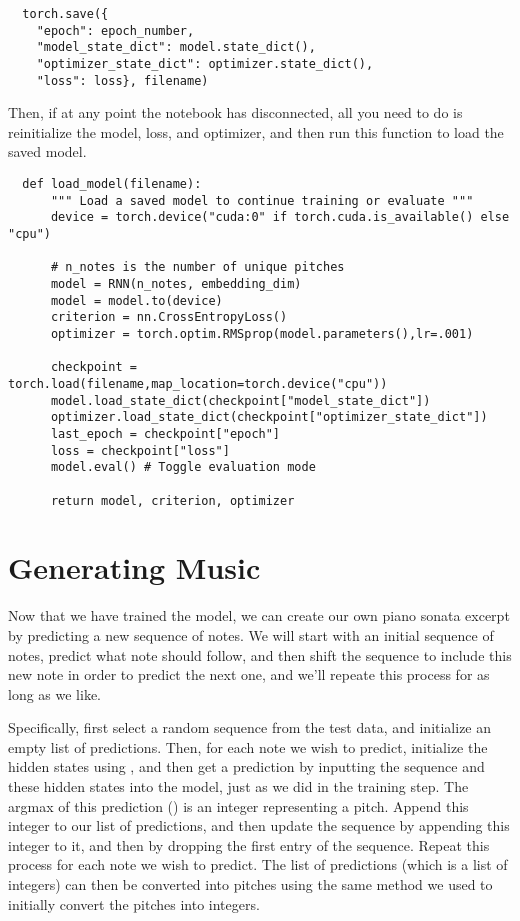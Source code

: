 \begin{problem}
\begin{warn}
\begin{lstlisting}
  torch.save({
    "epoch": epoch_number,
    "model_state_dict": model.state_dict(),
    "optimizer_state_dict": optimizer.state_dict(),
    "loss": loss}, filename)
\end{lstlisting}

Then, if at any point the notebook has disconnected, all you need to do is reinitialize the model, loss, and optimizer, and then run this function to load the saved model.
\begin{lstlisting}
  def load_model(filename):
      """ Load a saved model to continue training or evaluate """
      device = torch.device("cuda:0" if torch.cuda.is_available() else "cpu")

      # n_notes is the number of unique pitches
      model = RNN(n_notes, embedding_dim)
      model = model.to(device)
      criterion = nn.CrossEntropyLoss()
      optimizer = torch.optim.RMSprop(model.parameters(),lr=.001)

      checkpoint = torch.load(filename,map_location=torch.device("cpu"))
      model.load_state_dict(checkpoint["model_state_dict"])
      optimizer.load_state_dict(checkpoint["optimizer_state_dict"])
      last_epoch = checkpoint["epoch"]
      loss = checkpoint["loss"]
      model.eval() # Toggle evaluation mode

      return model, criterion, optimizer
  \end{lstlisting}
\end{warn}
\end{problem}

\section*{Generating Music}
Now that we have trained the model, we can create our own piano sonata excerpt by predicting a new sequence of notes.
We will start with an initial sequence of notes, predict what note should follow, and then shift the sequence to include this new note in order to predict the next one, and we'll repeate this process for as long as we like.

Specifically, first select a random sequence from the test data, and initialize an empty list of predictions.
Then, for each note we wish to predict, initialize the hidden states using , and then get a prediction by inputting the sequence and these hidden states into the model, just as we did in the training step.
The argmax of this prediction () is an integer representing a pitch.
Append this integer to our list of predictions, and then update the sequence by appending this integer to it, and then by dropping the first entry of the sequence.
Repeat this process for each note we wish to predict.
The list of predictions (which is a list of integers) can then be converted into pitches using the same method we used to initially convert the pitches into integers.


